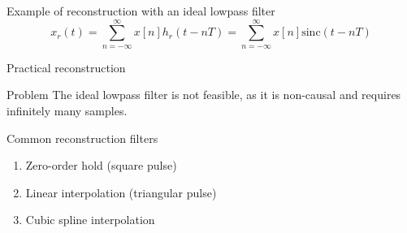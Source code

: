 \documentclass[10pt]{beamer}
\begin{document}
\begin{frame}{Example of reconstruction with an ideal lowpass filter}
	\vspace{-0.5cm}
	\begin{equation*}
	x_r(t) = \sum_{n=-\infty}^{\infty} x[n]h_r(t-nT) = \sum_{n=-\infty}^{\infty} x[n]\mathrm{sinc}(t-nT)
	\end{equation*}
	\begin{center}
		\resizebox{0.6\linewidth}{!}{}
	\end{center}
	
\end{frame}

\begin{frame}{Practical reconstruction}
	\begin{block}{Problem}
		The ideal lowpass filter is not feasible, as it is non-causal and requires infinitely many samples. 
	\end{block}

	\begin{block}{Common reconstruction filters}
		\begin{enumerate}
			\item Zero-order hold (square pulse)
			\item Linear interpolation (triangular pulse)
			\item Cubic spline interpolation
		\end{enumerate}
	\end{block}	
\end{frame}
\end{document}
